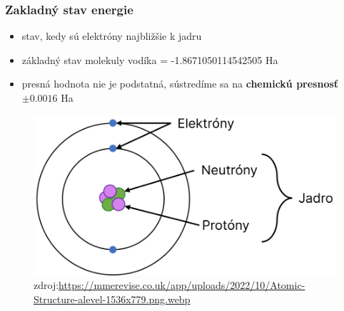\documentclass{beamer}
\begin{document}
\begin{frame}
    \frametitle{Zakladný stav energie}
    \begin{itemize}
        \item stav, kedy sú elektróny najbližšie k jadru
        \item základný stav molekuly vodíka = -1.8671050114542505 Ha
        \item presná hodnota nie je podstatná, sústredíme sa na \textbf{chemickú presnosť} $\pm 0.0016$ Ha
    \end{itemize}
    \centering
    \begin{figure}
        \centering
        \includegraphics[width=.8\textwidth]{atom-structure-sk.png}
        \tiny zdroj:\url{https://mmerevise.co.uk/app/uploads/2022/10/Atomic-Structure-alevel-1536x779.png.webp}

    \end{figure}
\end{frame}
\end{document}
